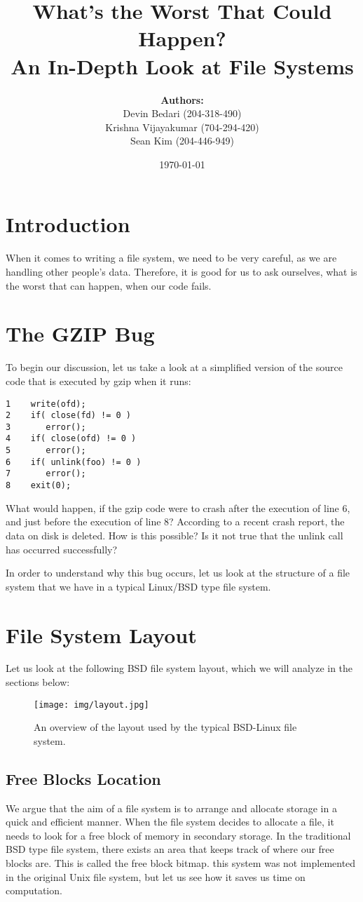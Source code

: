 \documentclass[a4paper]{article}
\title{What's the Worst That Could Happen? \\ \large\textbf{An In-Depth Look at File Systems}}
\author{\textbf{Authors:}\\ Devin Bedari (204-318-490)\\
Krishna Vijayakumar (704-294-420)\\
Sean Kim (204-446-949)}
\date{\today}
\begin{document}
\maketitle

\section{Introduction}

When it comes to writing a file system, we need to be very careful, as we are handling other people's data. Therefore, it is good for us to ask ourselves, what is the worst that can happen, when our code fails. 

\section{The GZIP Bug}
To begin our discussion, let us take a look at a simplified version of the source code that is executed by gzip when it runs:

\begin{lstlisting}
1    write(ofd);
2    if( close(fd) != 0 )
3    	error();
4    if( close(ofd) != 0 )
5    	error();
6    if( unlink(foo) != 0 )
7    	error();
8    exit(0);
\end{lstlisting}

What would happen, if the gzip code were to crash after the execution of line 6, and just before the execution of line 8? According to a recent crash report, the data on disk is deleted. How is this possible? Is it not true that the unlink call has occurred successfully?

In order to understand why this bug occurs, let us look at the structure of a file system that we have in a typical Linux/BSD type file system.

\section{File System Layout}
Let us look at the following BSD file system layout, which we will analyze in the sections below:

\begin{figure}
\centering
\texttt{[image: img/layout.jpg]}
\caption{\label{fig:BLayout}An overview of the layout used by the typical BSD-Linux file system.}
\end{figure}

\subsection{Free Blocks Location}
We argue that the aim of a file system is to arrange and allocate storage in a quick and efficient manner. When the file system decides to allocate a file, it needs to look for a free block of memory in secondary storage. In the traditional BSD type file system, there exists an area that keeps track of where our free blocks are. This is called the free block bitmap. this system was not implemented in the original Unix file system, but let us see how it saves us time on computation.
\end{document}

